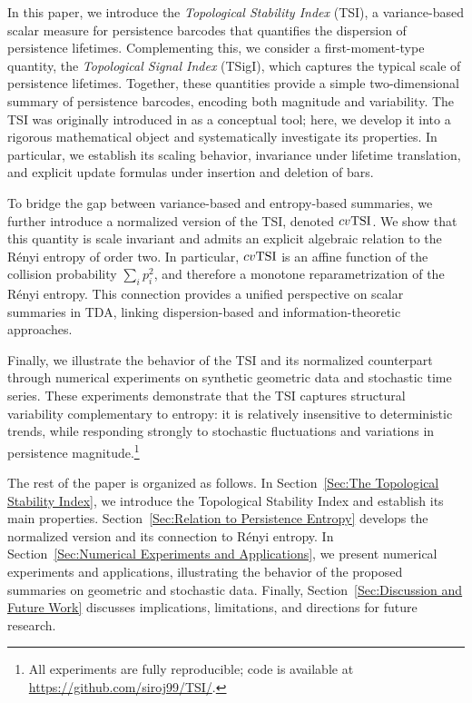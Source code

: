 \documentclass[11pt]{amsart}
\theoremstyle{definition}
\newcommand{\tsi}[0]{\textup{TSI}}
\begin{document}
In this paper, we introduce the \emph{Topological Stability Index} (TSI), a variance-based scalar measure for persistence barcodes that quantifies the dispersion of persistence lifetimes. Complementing this, we consider a first-moment-type quantity, the \emph{Topological Signal Index} (TSigI), which captures the typical scale of persistence lifetimes. Together, these quantities provide a simple two-dimensional summary of persistence barcodes, encoding both magnitude and variability. The TSI was originally introduced in \cite{diamantis_shape_2025} as a conceptual tool; here, we develop it into a rigorous mathematical object and systematically investigate its properties. In particular, we establish its scaling behavior, invariance under lifetime translation, and explicit update formulas under insertion and deletion of bars.


To bridge the gap between variance-based and entropy-based summaries, we further introduce a normalized version of the TSI, denoted $cv\tsi$. We show that this quantity is scale invariant and admits an explicit algebraic relation to the Rényi entropy of order two. In particular, $cv\tsi$ is an affine function of the collision probability $\sum_i p_i^2$, and therefore a monotone reparametrization of the Rényi entropy. This connection provides a unified perspective on scalar summaries in TDA, linking dispersion-based and information-theoretic approaches.

Finally, we illustrate the behavior of the TSI and its normalized counterpart through numerical experiments on synthetic geometric data and stochastic time series. These experiments demonstrate that the TSI captures structural variability complementary to entropy: it is relatively insensitive to deterministic trends, while responding strongly to stochastic fluctuations and variations in persistence magnitude.\footnote{All experiments are fully reproducible; code is available at \url{https://github.com/siroj99/TSI/}.}

\bigbreak 

The rest of the paper is organized as follows. In Section~\ref{Sec:The Topological Stability Index}, we introduce the Topological Stability Index and establish its main properties. Section~\ref{Sec:Relation to Persistence Entropy} develops the normalized version and its connection to Rényi entropy. In Section~\ref{Sec:Numerical Experiments and Applications}, we present numerical experiments and applications, illustrating the behavior of the proposed summaries on geometric and stochastic data. Finally, Section~\ref{Sec:Discussion and Future Work} discusses implications, limitations, and directions for future research.
\end{document}
